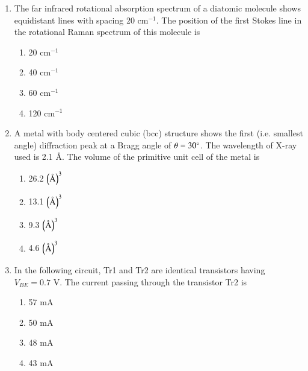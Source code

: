 \documentclass[journal]{IEEEtran}
\begin{document}
\begin{enumerate}
    \item The far infrared rotational absorption spectrum of a diatomic molecule shows
    equidistant lines with spacing 20 cm$^{-1}$. The position of the first Stokes line
    in the rotational Raman spectrum of this molecule is
    \begin{multicols}{4}
        \begin{enumerate}
            \item 20 cm$^{-1}$
            \item 40 cm$^{-1}$
            \item 60 cm$^{-1}$
            \item 120 cm$^{-1}$
        \end{enumerate}
    \end{multicols}

    \item A metal with body centered cubic (bcc) structure shows the first (i.e. smallest angle)
    diffraction peak at a Bragg angle of $\theta = 30\degree$. The wavelength of X-ray used is 2.1
    \AA. The volume of the primitive unit cell of the metal is
    \begin{multicols}{4}
        \begin{enumerate}
            \item 26.2 $\left(\text{\AA}\right)^3$
            \item 13.1 $\left(\text{\AA}\right)^3$
            \item 9.3 $\left(\text{\AA}\right)^3$
            \item 4.6 $\left(\text{\AA}\right)^3$
        \end{enumerate}
    \end{multicols}

    \item In the following circuit, Tr1 and Tr2 are identical transistors
    having $V_{BE} = 0.7$ V. The current passing through the transistor Tr2 is

    
    
    \begin{multicols}{4}
        \begin{enumerate}
            \item 57 mA
            \item 50 mA
            \item 48 mA
            \item 43 mA
        \end{enumerate}
    \end{multicols}


\end{enumerate}
\end{document}
